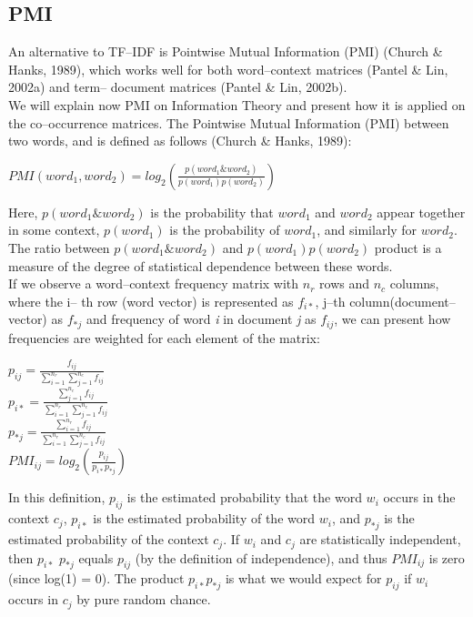 \subsection{PMI}\label{pmi}
An alternative to TF--IDF is Pointwise Mutual Information (PMI) (Church \& Hanks, 1989)\cite{church89}, 
which works well for both word--context matrices (Pantel \& Lin, 2002a)\cite{pantelLin2002} and term--
document matrices (Pantel \& Lin, 2002b).  
\\We will explain now PMI on Information Theory and present how it is applied on the co--occurrence 
matrices. The Pointwise Mutual Information (PMI) between two words, and is defined as follows (Church 
\& Hanks, 1989):
\begin{center}\large{
$PMI(word_{1}, word_{2}) = log_{2}(\frac{p(word_{1} \& word_{2})}{p(word_{1})p(word_{2})}) $
}
\end{center}
Here, $p(word_{1} \& word_{2})$ is the probability that $word_{1}$ and $word_{2}$ appear together in 
some context,  $p(word_{1})$ is the probability of $word_{1}$, and similarly for $word_{2}$. The ratio 
between $p(word_{1} \& word_{2})$ and $p(word_{1})p(word_{2})$ product  is a measure of the 
degree of statistical dependence between these words. 
\\If we observe a word--context frequency matrix with $n_{r}$ rows and $n_{c}$ columns, where the i--
th row (word vector) is represented as $f_{i*}$, j--th column(document--vector) as $f_{*j}$  and 
frequency of word \textit{i} in document \textit{j} as $f_{ij}$, we can present how frequencies are 
weighted for each element of the matrix:
\begin{center}\LARGE{
$p_{ij} =  \frac{f_{ij}}{ \sum_{i=1}^{n_{r}}\sum_{j=1}^{n_{c}}f_{ij}}  $
\\$p_{i*} =  \frac{ \sum_{j=1}^{n_{c}}f_{ij}}{ \sum_{i=1}^{n_{r}}\sum_{j=1}^{n_{c}}f_{ij}}  $
\\$p_{*j} =  \frac{ \sum_{i=1}^{n_{r}}f_{ij}}{ \sum_{i=1}^{n_{r}}\sum_{j=1}^{n_{c}}f_{ij}}  $
}
\Large{
\\$PMI_{ij}=log_{2}(\frac{p_{ij}}{p_{i*}p_{*j}})  $
}
\end{center}
In this definition, $p_{ij}$ is the estimated probability that the word $w_{i}$ occurs in the context $c_{j}$, $p_{i*}$ is the estimated probability of the word $w_{i}$, and $p_{*j}$ is the estimated probability of the context $c_{j}$. If $w_{i}$ and $c_{j}$ are statistically independent, then  $p_{i*}$ $p_{*j}$ equals $p_{ij}$ (by the definition of independence), and thus  $PMI_{ij}$ is zero (since log(1) = 0). The product $p_{i*}$$p_{*j}$ is what we would expect for $p_{ij}$ if $w_{i}$ occurs in $c_{j}$ by pure random chance. 

